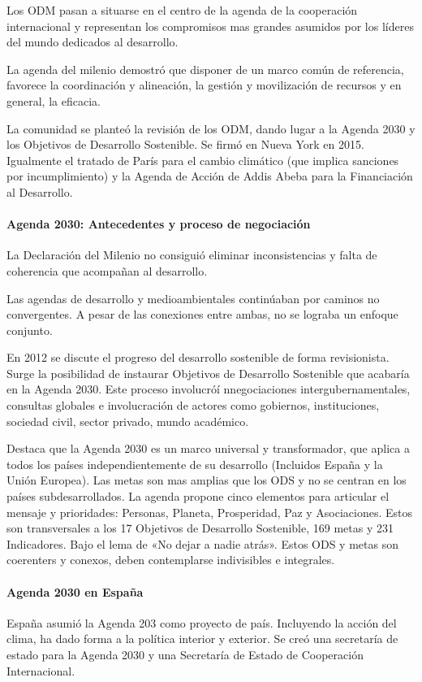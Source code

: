         Los ODM pasan a situarse en el centro de la agenda de la cooperación internacional y representan los compromisos mas grandes asumidos por los líderes del mundo dedicados al desarrollo.

        La agenda del milenio demostró que disponer de un marco común de  referencia, favorece la coordinación y alineación, la gestión y movilización de recursos y en general, la eficacia.

        La comunidad se planteó la revisión de los ODM, dando lugar a la Agenda 2030 y los Objetivos de Desarrollo Sostenible. Se firmó en Nueva York en 2015. Igualmente el tratado de París para el cambio climático (que implica sanciones por incumplimiento) y la Agenda de Acción de Addis Abeba para la Financiación al Desarrollo.

        \paragraph{Agenda 2030: Antecedentes y proceso de negociación}
            La Declaración del Milenio no consiguió eliminar inconsistencias y falta de coherencia que acompañan al desarrollo.

            Las agendas de desarrollo y medioambientales continúaban por caminos no convergentes. A pesar de las conexiones entre ambas, no se lograba un enfoque conjunto.

            En 2012 se discute el progreso del desarrollo sostenible de forma revisionista. Surge la posibilidad de instaurar Objetivos de Desarrollo Sostenible que acabaría en la Agenda 2030. Este proceso involucróí nnegociaciones intergubernamentales, consultas globales e involucración de actores como gobiernos, instituciones, sociedad civil, sector privado, mundo académico.

            Destaca que la Agenda 2030 es un marco universal y transformador, que aplica a todos los países independientemente de su desarrollo (Incluidos España y la Unión Europea). Las metas son mas amplias que los ODS y no se centran en los países subdesarrollados. La agenda propone cinco elementos para articular el mensaje y prioridades: Personas, Planeta, Prosperidad, Paz y Asociaciones. Estos son transversales a los 17 Objetivos de Desarrollo Sostenible, 169 metas y 231 Indicadores. Bajo el lema de «No dejar a nadie atrás». Estos ODS y metas son coerenters y conexos, deben contemplarse indivisibles e integrales.

        \paragraph{Agenda 2030 en España}
            España asumió la Agenda 203 como proyecto de país. Incluyendo la acción del clima, ha dado forma a la política interior y exterior. Se creó una secretaría de estado para la Agenda 2030 y una Secretaría de Estado de Cooperación Internacional.

